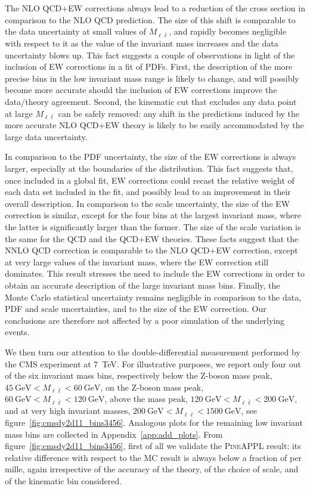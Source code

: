 The NLO QCD+EW corrections always lead to a reduction of the cross section in
comparison to the NLO QCD prediction. The size of this shift is comparable to
the data uncertainty at small values of $M_{\ell\bar\ell}$, and rapidly becomes
negligible with respect to it as the value of the invariant mass increases
and the data uncertainty blows up. This fact suggests a couple of observations
in light of the inclusion of EW corrections in a fit of PDFs. First, the
description of the more precise bins in the low invariant mass range is likely
to change, and will possibly become more accurate should the inclusion of EW
corrections improve the data/theory agreement. Second, the kinematic cut that
excludes any data point at large $M_{\ell\bar\ell}$ can be safely removed: any
shift in the predictions induced by the more accurate NLO QCD+EW theory is
likely to be easily accommodated by the large data uncertainty.

In comparison to the PDF uncertainty, the size of the EW corrections is
always larger, especially at the boundaries of the distribution. This fact
suggests that, once included in a global fit, EW corrections could recast the
relative weight of each data set included in the fit, and possibly lead to
an improvement in their overall description. In comparison to the scale
uncertainty, the size of the EW correction is similar, except for the four bins
at the largest invariant mass, where the latter is significantly larger than
the former. The size of the scale variation is the same for the QCD and the
QCD+EW theories. These facts suggest that the NNLO QCD correction is comparable
to the NLO QCD+EW correction, except at very large values of the invariant mass,
where the EW correction still dominates. This result stresses the need to
include the EW corrections in order to obtain an accurate description of the
large invariant mass bins. Finally, the Monte Carlo statistical
uncertainty remains negligible in comparison to the data, PDF and scale
uncertainties, and to the size of the EW correction. Our conclusions are
therefore not affected by a poor simulation of the underlying events.

We then turn our attention to the double-differential measurement performed by
the CMS experiment at \SI{7}{\tera\electronvolt}. For illustrative purposes, we report only four out
of the six invariant mass bins, respectively below the Z-boson mass peak,
$\SI{45}{\giga\electronvolt}<M_{\ell\bar\ell}<\SI{60}{\giga\electronvolt}$, on the Z-boson mass peak,
$\SI{60}{\giga\electronvolt}<M_{\ell\bar\ell}<\SI{120}{\giga\electronvolt}$, above the mass peak,
$\SI{120}{\giga\electronvolt}<M_{\ell\bar\ell}<\SI{200}{\giga\electronvolt}$, and at very high invariant masses,
$\SI{200}{\giga\electronvolt}<M_{\ell\bar\ell}<\SI{1500}{\giga\electronvolt}$, see figure~\ref{fig:cmsdy2d11_bins3456}.
Analogous plots for the remaining low invariant mass bins are collected in
Appendix~\ref{app:add_plots}. From figure~\ref{fig:cmsdy2d11_bins3456},
first of all we validate the \textsc{PineAPPL} result: its relative difference
with respect to the \textsc{MC} result is always below a fraction of per mille,
again irrespective of the accuracy of the theory, of the choice of scale, and
of the kinematic bin considered. 

